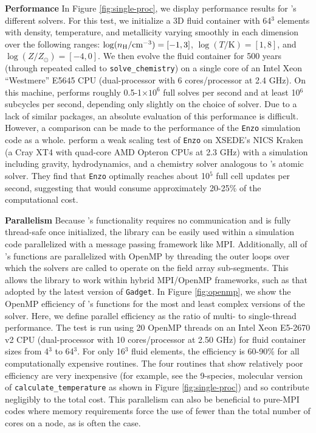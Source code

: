 \noindent
{\bf Performance}
In Figure \ref{fig:single-proc}, we
display performance results for \grackle{}'s different solvers.  For
this test, we initialize a 3D fluid container with 64$^{3}$ elements
with density, temperature, and metallicity varying smoothly in each
dimension over the following ranges: $\log (n_{\rm H} /
\textrm{cm}^{-3}) = [-1, 3]$, $\log (T/\textrm{K}) = [1, 8]$, and
$\log (Z/Z_\odot) = [-4, 0]$.  We then evolve the fluid container for
500 years (through repeated called to \texttt{solve\_chemistry}) on a
single core of an Intel Xeon ``Westmere'' E5645 CPU (dual-processor with
6 cores/processor at 2.4 GHz).  On this machine, \grackle{} performs
roughly 0.5-1$\times10^{6}$ full solves per second and at least
10$^{6}$ subcycles per second, depending only slightly on the choice
of solver.  Due to a lack of similar packages, an absolute evaluation
of this performance is difficult.  However, a comparison can be made
to the performance of the \texttt{Enzo} simulation code as a whole.
\citet{2014ApJS..211...19B} perform a weak scaling test of
\texttt{Enzo} on XSEDE's NICS Kraken (a Cray XT4 with quad-core AMD
Opteron CPUs at 2.3 GHz) with a simulation including gravity,
hydrodynamics, and a chemistry solver analogous to \grackle{}'s atomic
solver.  They find that \texttt{Enzo} optimally reaches about 10$^{5}$
full cell updates per second, suggesting that \grackle{} would consume
approximately 20-25\% of the computational cost.

\noindent
{\bf Parallelism}
Because \grackle{}'s functionality requires no communication and is
fully thread-safe once initialized, the library can be easily used
within a simulation code parallelized with a message passing framework
like MPI.  Additionally, all of \grackle{}'s functions are
parallelized with OpenMP by threading the outer loops over which the
solvers are called to operate on the field array sub-segments.  This
allows the library to work within hybrid MPI/OpenMP frameworks, such
as that adopted by the latest version of \texttt{Gadget}.
In Figure \ref{fig:openmp}, we show the OpenMP efficiency of
\grackle{}'s functions for the most and least complex versions
of the solver.  Here, we define parallel efficiency as the ratio of
multi- to single-thread performance.  The test is run using 20 OpenMP
threads on an Intel Xeon E5-2670 v2 CPU (dual-processor with 10
cores/processor at 2.50 GHz) for fluid container sizes from 4$^{3}$ to
64$^{3}$.  For only 16$^{3}$ fluid elements, the efficiency is 60-90\%
for all computationally expensive routines.  The four routines that
show relatively poor efficiency are very inexpensive (for example, see
the 9-species, molecular version of \texttt{calculate\_temperature} as
shown in Figure \ref{fig:single-proc}) and so contribute negligibly to
the total cost.  This parallelism can also be beneficial to pure-MPI codes
where memory requirements force the use of fewer than the total number
of cores on a node, as is often the case.

